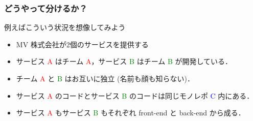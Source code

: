 \begin{frame}
    \frametitle{どうやって分けるか？}
    例えばこういう状況を想像してみよう
    \begin{itemize}
        \item<2-> MV 株式会社が2個のサービスを提供する
        \item<3-> サービス \textcolor{red}{A} はチーム \textcolor{red}{A}，サービス \textcolor{green}{B} はチーム \textcolor{green}{B} が開発している．
        \item<5-> チーム \textcolor{red}{A} と \textcolor{green}{B} はお互いに独立 (名前も顔も知らない)．
        \item<6-> サービス \textcolor{red}{A} のコードとサービス \textcolor{green}{B} のコードは同じモノレポ \textcolor{blue}{C} 内にある．
        \item<7-> サービス \textcolor{red}{A} もサービス \textcolor{green}{B} もそれぞれ front-end と back-end から成る．
    \end{itemize}
\end{frame}
